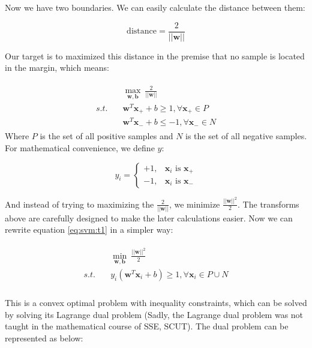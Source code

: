 Now we have two boundaries. We can easily calculate the distance between them:

\begin{equation}
\mathrm{distance} = \frac{2}{||\mathbf{w}||}
\end{equation}

Our target is to maximized this distance in the premise that no sample is located in the margin, which means:

\begin{align}
\begin{split}
& \max_{\mathbf{w},\mathbf{b}} \ \frac{2}{||\mathbf{w}||} \\ 
s.t. \quad & \mathbf{w}^T \mathbf{x}_+ + b \geq 1, \forall \mathbf{x}_+ \in P\\
 & \mathbf{w}^T \mathbf{x}_- + b \leq -1 , \forall \mathbf{x}_- \in N
\end{split}
\label{eq:svm:t1}
\end{align}
Where $P$ is the set of all positive samples and $N$ is the set of all negative samples.
For mathematical convenience, we define $y$:

\begin{equation}
y_i = 
\begin{cases}  
+1,& \mathbf{x}_i \text{ is } \mathbf{x}_+\\
-1,& \mathbf{x}_i \text{ is } \mathbf{x}_-
\end{cases}
\end{equation}

And instead of trying to maximizing the $\frac{2}{||\mathbf{w}||} $, we minimize $\frac{||\mathbf{w}||^2}{2}$. 
The transforms above are carefully designed to make the later calculations easier. 
Now we can rewrite equation \ref{eq:svm:t1} in a simpler way:

\begin{align}
\begin{split}
& \min_{\mathbf{w},\mathbf{b}} \ \frac{||\mathbf{w}||^2}{2} \\ 
s.t. \quad & y_i(\mathbf{w}^T \mathbf{x}_i + b) \geq 1, \forall \mathbf{x}_i \in P \cup N \\ 
\end{split}
\end{align}

This is a convex optimal problem with inequality constraints, which can be solved by solving its Lagrange dual problem 
(Sadly, the Lagrange dual problem was not taught in the mathematical course of SSE, SCUT).
The dual problem can be represented as below:

